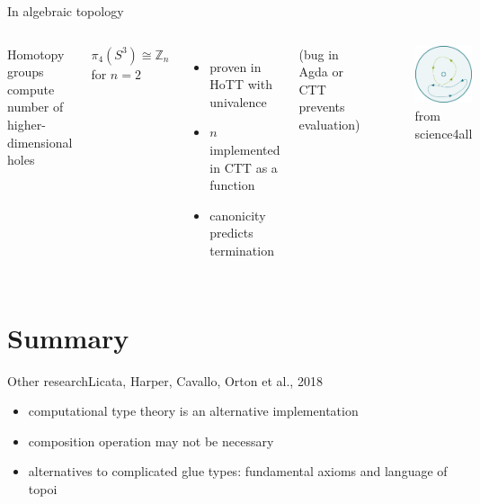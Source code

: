 \documentclass[english,draft]{beamer}
\begin{document}
\begin{frame}{In algebraic topology}

 \begin{columns}%
        Homotopy groups compute number of higher-dimensional holes
        \begin{theorem}
            $\pi _ 4 (S^3) \cong \mathbb{Z}_n$ for $n=2$ 

            \end{theorem}
            \begin{itemize}
            \item proven in HoTT with univalence
            \item $n$ implemented in CTT as a function
            \item canonicity predicts termination
            \end{itemize}
        (bug in Agda or CTT prevents evaluation)

            \begin{figure}
                \includegraphics[height=0.4\textheight]{figures/loops}
                \caption{from science4all}
            \end{figure}
    \end{columns}

\end{frame}

\section*{Summary}


\begin{frame}{Other research}{Licata, Harper, Cavallo, Orton et al., 2018}
    \begin{itemize}
        \item computational type theory is an alternative implementation 
        \item composition operation may not be necessary
        \item alternatives to complicated glue types: fundamental axioms and language of topoi
    \end{itemize}
\end{frame}
\end{document}
